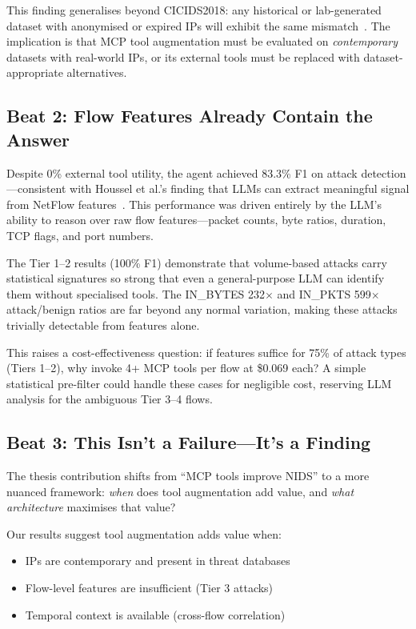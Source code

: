\documentclass[12pt, a4paper, oneside]{report}
\begin{document}
This finding generalises beyond CICIDS2018: any historical or lab-generated
dataset with anonymised or expired IPs will exhibit the same
mismatch~\cite{kenyon2020datasets, transferability2022}. The implication is
that MCP tool augmentation must be evaluated on \emph{contemporary} datasets
with real-world IPs, or its external tools must be replaced with
dataset-appropriate alternatives.

\subsection{Beat 2: Flow Features Already Contain the Answer}

Despite 0\% external tool utility, the agent achieved 83.3\% F1 on attack
detection---consistent with Houssel et al.'s finding that LLMs can extract
meaningful signal from NetFlow features~\cite{houssel2024towards, houssel2025exnids}.
This performance was driven entirely by the LLM's ability to reason over raw flow
features---packet counts, byte ratios, duration, TCP flags, and port numbers.

The Tier 1--2 results (100\% F1) demonstrate that volume-based attacks carry
statistical signatures so strong that even a general-purpose LLM can identify
them without specialised tools. The IN\_BYTES 232$\times$ and IN\_PKTS
599$\times$ attack/benign ratios are far beyond any normal variation, making
these attacks trivially detectable from features alone.

This raises a cost-effectiveness question: if features suffice for 75\% of
attack types (Tiers 1--2), why invoke 4+ MCP tools per flow at \$0.069 each?
A simple statistical pre-filter could handle these cases for negligible cost,
reserving LLM analysis for the ambiguous Tier 3--4 flows.

\subsection{Beat 3: This Isn't a Failure---It's a Finding}

The thesis contribution shifts from ``MCP tools improve NIDS'' to a more
nuanced framework: \emph{when} does tool augmentation add value, and \emph{what
architecture} maximises that value?

Our results suggest tool augmentation adds value when:
\begin{itemize}
  \item IPs are contemporary and present in threat databases
  \item Flow-level features are insufficient (Tier 3 attacks)
  \item Temporal context is available (cross-flow correlation)
\end{itemize}
\end{document}
